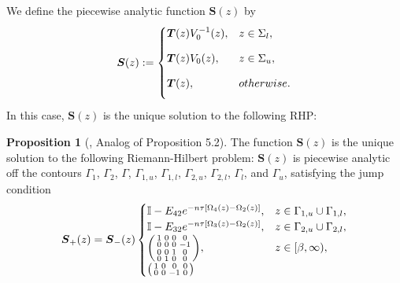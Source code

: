 \documentclass[usenames,dvipsnames]{article}
\theoremstyle{definition}
\newtheorem{prop}{Proposition}[section]
\numberwithin{equation}{section}
\numberwithin{figure}{section}
\begin{document}
We define the piecewise analytic function $\boldsymbol{S}(z)$ by
    \begin{equation}
        \boldsymbol{S}(z) := 
        \begin{cases}
        \vspace{3mm}
        \boldsymbol{T}(z)V_0^{-1}(z), & z\in\Sigma_{l},\\
        \vspace{3mm}
        \boldsymbol{T}(z)V_0(z), & z\in\Sigma_{u},\\
    \vspace{3mm}
        \boldsymbol{T}(z), & otherwise.
        \end{cases}
    \end{equation}
In this case, $\boldsymbol{S}(z)$ is the unique solution to the following RHP:
    \begin{prop}[\cite{DHL1}, Analog of Proposition 5.2] \label{lensing-proposition}
        The function $\boldsymbol{S}(z)$ is the unique solution to the following Riemann-Hilbert problem:
        $\boldsymbol{S}(z)$ is piecewise analytic off the contours $\Gamma_1 $, $\Gamma_2$, $\Gamma$, $\Gamma_{1,u}$, $\Gamma_{1,l}$, $\Gamma_{2,u}$, $\Gamma_{2,l}$, $\Gamma_l$, and $\Gamma_u$, satisfying the jump condition
            \begin{equation} \label{S-jumps}
                \boldsymbol{S}_{+}(z) = \boldsymbol{S}_{-}(z)
                \begin{cases}
                       \mathbb{I} - E_{42}e^{-n\tau[\Omega_4(z) - \Omega_2(z)]}, & z\in \Gamma_{1,u} \cup \Gamma_{1,l},\\
                       \mathbb{I} - E_{32}e^{-n\tau[\Omega_3(z) - \Omega_2(z)]}, & z\in \Gamma_{2,u} \cup \Gamma_{2,l},\\
                       \begin{psmallmatrix}
                            1 & 0 & 0 & 0\\
                            0 & 0 & 0 & -1\\
                            0 & 0 & 1 & 0\\
                            0 & 1 & 0 & 0
                        \end{psmallmatrix}, & z\in [\beta,\infty),\\
                        \begin{psmallmatrix}
                            1 & 0 & 0 & 0\\
                            0 & 0 & -1 & 0\\

\end{psmallmatrix}
\end{cases}
\end{equation}
\end{prop}
\end{document}

